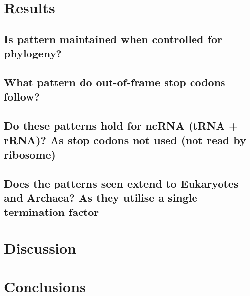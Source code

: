\documentclass[
    emulatestandardclasses,
    parskip=half,
]{scrartcl}
\begin{document}
    \section{Results}
        \subsection{Is pattern maintained when controlled for phylogeny?}
        \subsection{What pattern do out-of-frame stop codons follow?}
        \subsection{Do these patterns hold for ncRNA (tRNA + rRNA)?
                    As stop codons not used (not read by ribosome)}
        \subsection{Does the patterns seen extend to Eukaryotes and Archaea?
                    As they utilise a single termination factor}
    \section{Discussion}

    \section{Conclusions}

	\newpage {}
	\printbibliography
	\appendix\appendixpage
\end{document}
